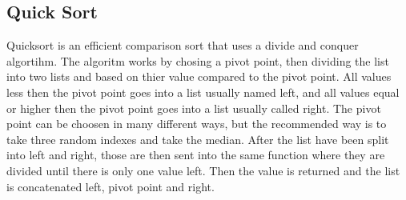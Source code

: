 \subsection{Quick Sort}
Quicksort is an efficient comparison sort that uses a divide and conquer algortihm. The algoritm works by chosing a pivot point, then dividing the list into two lists and based on thier value compared to the pivot point. All values less then the pivot point goes into a list usually named left, and all values equal or higher then the pivot point goes into a list usually called right. The pivot point can be choosen in many different ways, but the recommended way is to take three random indexes and take the median. After the list have been split into left and right, those are then sent into the same function where they are divided until there is only one value left. Then the value is returned and the list is concatenated left, pivot point and right.